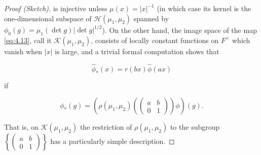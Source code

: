 \begin{proof}[Proof (Sketch)]
is injective unless $\mu(x) = |x|^{-1}$ (in which case its kernel is the one-dimensional subspace of $\mathcal{H}(\mu_1, \mu_2)$ spanned by $\phi_0(g) = \mu_1(\det g)|\det g|^{1/2}$). On the other hand, the image space of the map \eqref{eq:4.13}, call it $\mathcal{K}(\mu_1, \mu_2)$, consists of locally constant functions on $F^{\times}$ which vanish when $|x|$ is large, and a trivial formal computation shows that

\begin{equation}\label{eq:4.14}
\hat{\phi}_*(x) = r(bx)\hat{\phi}(ax)\tag{4.14}
\end{equation}

if

\[
\phi_*(g) = \left(\rho(\mu_1, \mu_2)\left(\begin{pmatrix} a & b \\ 0 & 1 \end{pmatrix}\right)\phi\right)(g).
\]

That is, on $\mathcal{K}(\mu_1, \mu_2)$ the restriction of $\rho(\mu_1, \mu_2)$ to the subgroup $\left\{\begin{pmatrix} a & b \\ 0 & 1 \end{pmatrix}\right\}$ has a particularly simple description.


\end{proof}

